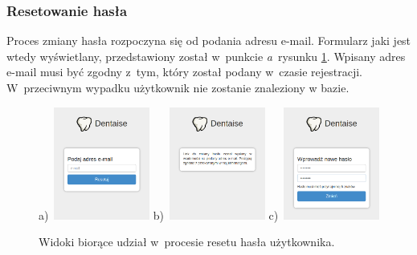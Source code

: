 \documentclass[11pt]{aghdpl}
\begin{document}
\subsubsection{Resetowanie hasła}
\label{sec:resetowanieHaslaWidok}


Proces zmiany hasła rozpoczyna się od podania adresu e-mail. Formularz jaki jest wtedy wyświetlany, przedstawiony został w~punkcie \emph{a}~rysunku \ref{fig:resetHasla}. Wpisany adres e-mail musi być zgodny z~tym, który został podany w~czasie rejestracji. W~przeciwnym wypadku użytkownik nie zostanie znaleziony w bazie.

\begin{figure}[h!]
	\begin{center}
		a)~\includegraphics[width=0.28\textwidth]{reset-hasla-1}
		\hspace{5mm}
		b)~\includegraphics[width=0.28\textwidth]{reset-hasla-2}
		\hspace{5mm}
		c)~\includegraphics[width=0.28\textwidth]{reset-hasla-3}
	\end{center}
	\caption{Widoki biorące udział w~procesie resetu hasła użytkownika.}
	\label{fig:resetHasla}
\end{figure}
\end{document}
